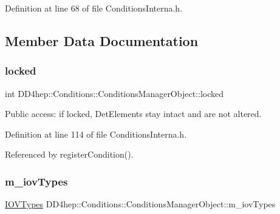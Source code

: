 Definition at line 68 of file Conditions\+Interna.\+h.



\subsection{Member Data Documentation}
\hypertarget{class_d_d4hep_1_1_conditions_1_1_conditions_manager_object_af4a66ea9d20e133cadd6e33a188d7f5b}{}\label{class_d_d4hep_1_1_conditions_1_1_conditions_manager_object_af4a66ea9d20e133cadd6e33a188d7f5b} 
\subsubsection{\texorpdfstring{locked}{locked}}
{\footnotesize\ttfamily int D\+D4hep\+::\+Conditions\+::\+Conditions\+Manager\+Object\+::locked}



Public access\+: if locked, Det\+Elements stay intact and are not altered. 



Definition at line 114 of file Conditions\+Interna.\+h.



Referenced by register\+Condition().

\hypertarget{class_d_d4hep_1_1_conditions_1_1_conditions_manager_object_abc6f28abb03bdfa1f3c0d51de6e6ac9d}{}\label{class_d_d4hep_1_1_conditions_1_1_conditions_manager_object_abc6f28abb03bdfa1f3c0d51de6e6ac9d} 
\subsubsection{\texorpdfstring{m\+\_\+iov\+Types}{m\_iovTypes}}
{\footnotesize\ttfamily \hyperlink{class_d_d4hep_1_1_conditions_1_1_conditions_manager_object_a8c3b7d5bdfb7fc6bf6e61ddba5a5f652}{I\+O\+V\+Types} D\+D4hep\+::\+Conditions\+::\+Conditions\+Manager\+Object\+::m\+\_\+iov\+Types}



